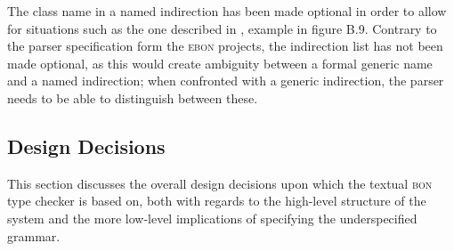 The class name in a named indirection has been made optional in order to allow for situations such as the one described in \cite[p.~372]{walden1995}, example in figure B.9. Contrary to the \bon{} parser specification form the \textsc{ebon} projects, the indirection list has not been made optional, as this would create ambiguity between a formal generic name and a named indirection; when confronted with a generic indirection, the parser needs to be able to distinguish between these.

\subsection{Design Decisions}
This section discusses the overall design decisions upon which the textual \textsc{bon} type checker is based on, both with regards to the high-level structure of the system and the more low-level implications of specifying the underspecified grammar.
